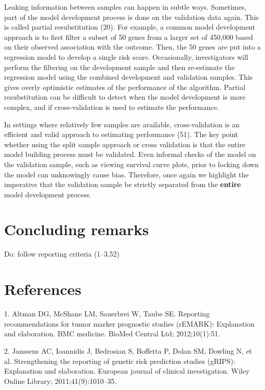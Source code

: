 \documentclass[11pt]{article}
\begin{document}
Leaking information between samples can happen in subtle ways.
Sometimes, part of the model development process is done on the
validation data again. This is called partial resubstitution (20). For
example, a common model development approach is to first filter a subset
of 50 genes from a larger set of 450,000 based on their observed
association with the outcome. Then, the 50 genes are put into a
regression model to develop a single risk score. Occasionally,
investigators will perform the filtering on the development sample and
then re-estimate the regression model using the combined development and
validation samples. This gives overly optimistic estimates of the
performance of the algorithm. Partial resubstitution can be difficult to
detect when the model development is more complex, and if
cross-validation is used to estimate the performance.

In settings where relatively few samples are available, cross-validation
is an efficient and valid approach to estimating performance (51). The
key point whether using the split sample approach or cross validation is
that the entire model building process must be validated. Even informal
checks of the model on the validation sample, such as viewing survival
curve plots, prior to locking down the model can unknowingly cause bias.
Therefore, once again we highlight the imperative that the validation
sample be strictly separated from the \textbf{entire} model development
process.

\section{Concluding remarks}\label{concluding-remarks}

Do: follow reporting criteria (1--3,52)

\section{References}\label{references}

\setlength{\parindent}{0pt}

1. Altman DG, McShane LM, Sauerbrei W, Taube SE. Reporting
recommendations for tumor marker prognostic studies (rEMARK):
Explanation and elaboration. BMC medicine. BioMed Central Ltd;
2012;10(1):51.

2. Janssens AC, Ioannidis J, Bedrosian S, Boffetta P, Dolan SM, Dowling
N, et al. Strengthening the reporting of genetic risk prediction studies
(gRIPS): Explanation and elaboration. European journal of clinical
investigation. Wiley Online Library; 2011;41(9):1010--35.
\end{document}
